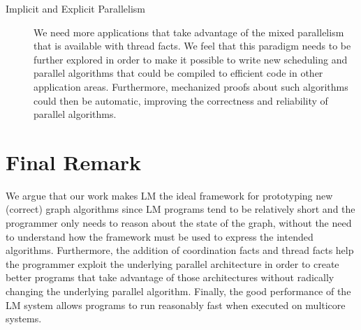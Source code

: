 \begin{description}
\item[Implicit and Explicit Parallelism] We need more applications that take
   advantage of the mixed parallelism that is available with thread facts. We
   feel that this paradigm needs to be further explored in order to make it
   possible to write new scheduling and parallel algorithms that could be
   compiled to efficient code in other application areas. Furthermore,
   mechanized proofs about such algorithms could then be automatic, improving
   the correctness and reliability of parallel algorithms.

\end{description}

\section{Final Remark}

We argue that our work makes LM the ideal framework for prototyping new
(correct) graph algorithms since LM programs tend to be relatively short and the
programmer only needs to reason about the state of the graph, without the need
to understand how the framework must be used to express the intended algorithms.
Furthermore, the addition of coordination facts and thread facts help the
programmer exploit the underlying parallel architecture in order to create
better programs that take advantage of those architectures without radically
changing the underlying parallel algorithm.  Finally, the good performance of
the LM system allows programs to run reasonably fast when executed on multicore
systems.

